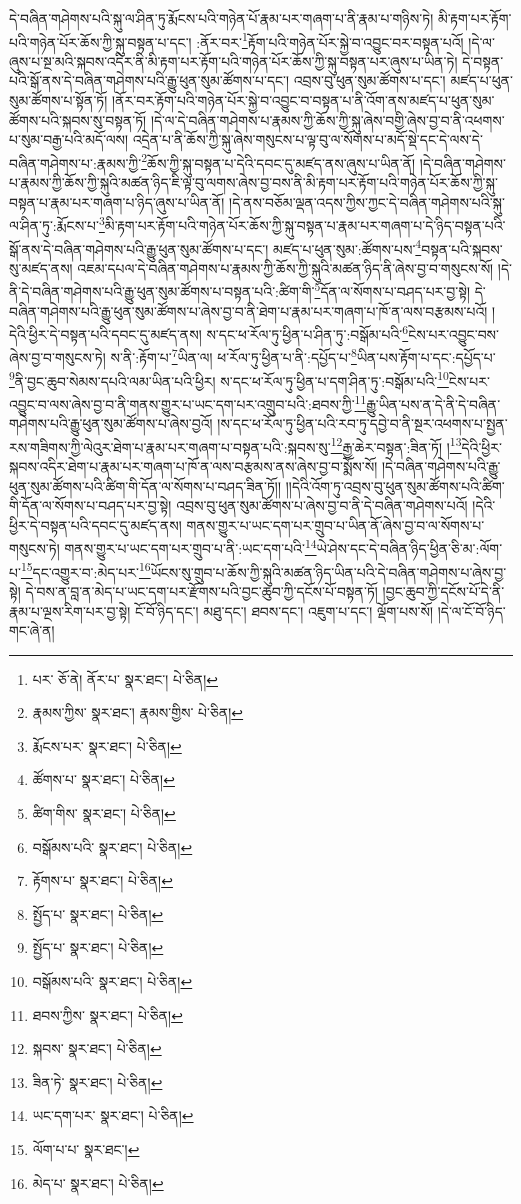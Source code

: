 དེ་བཞིན་གཤེགས་པའི་སྐུ་ལ་ཤིན་ཏུ་རྨོངས་པའི་གཉེན་པོ་རྣམ་པར་གཞག་པ་ནི་རྣམ་པ་གཉིས་ཏེ། མི་རྟག་པར་རྟོག་པའི་གཉེན་པོར་ཆོས་ཀྱི་སྐུ་བསྟན་པ་དང་། :ནོར་བར་\footnote{པར་  ཅོ་ནེ། ནོར་པ་  སྣར་ཐང་།  པེ་ཅིན། }རྟོག་པའི་གཉེན་པོར་སྐྱེ་བ་འབྱུང་བར་བསྟན་པའོ། །དེ་ལ་ཞུས་པ་སྔ་མའི་སྐབས་འདིར་ནི་མི་རྟག་པར་རྟོག་པའི་གཉེན་པོར་ཆོས་ཀྱི་སྐུ་བསྟན་པར་ཞུས་པ་ཡིན་ཏེ། དེ་བསྟན་པའི་སྒོ་ནས་དེ་བཞིན་གཤེགས་པའི་རྒྱུ་ཕུན་སུམ་ཚོགས་པ་དང་། འབྲས་བུ་ཕུན་སུམ་ཚོགས་པ་དང་། མཛད་པ་ཕུན་སུམ་ཚོགས་པ་སྟོན་ཏོ། །ནོར་བར་རྟོག་པའི་གཉེན་པོར་སྐྱེ་བ་འབྱུང་བ་བསྟན་པ་ནི་འོག་ནས་མཛད་པ་ཕུན་སུམ་ཚོགས་པའི་སྐབས་སུ་བསྟན་ཏོ། །དེ་ལ་དེ་བཞིན་གཤེགས་པ་རྣམས་ཀྱི་ཆོས་ཀྱི་སྐུ་ཞེས་བགྱི་ཞེས་བྱ་བ་ནི་འཕགས་པ་སུམ་བརྒྱ་པའི་མདོ་ལས། འདྲེན་པ་ནི་ཆོས་ཀྱི་སྐུ་ཞེས་གསུངས་པ་ལྟ་བུ་ལ་སོགས་པ་མདོ་སྡེ་དང་དེ་ལས་དེ་བཞིན་གཤེགས་པ་:རྣམས་ཀྱི་\footnote{རྣམས་ཀྱིས་  སྣར་ཐང་། རྣམས་གྱིས་  པེ་ཅིན། }ཆོས་ཀྱི་སྐུ་བསྟན་པ་དེའི་དབང་དུ་མཛད་ནས་ཞུས་པ་ཡིན་ནོ། །དེ་བཞིན་གཤེགས་པ་རྣམས་ཀྱི་ཆོས་ཀྱི་སྐུའི་མཚན་ཉིད་ཇི་ལྟ་བུ་ལགས་ཞེས་བྱ་བས་ནི་མི་རྟག་པར་རྟོག་པའི་གཉེན་པོར་ཆོས་ཀྱི་སྐུ་བསྟན་པ་རྣམ་པར་གཞག་པ་ཉིད་ཞུས་པ་ཡིན་ནོ། །དེ་ནས་བཅོམ་ལྡན་འདས་ཀྱིས་ཀྱང་དེ་བཞིན་གཤེགས་པའི་སྐུ་ལ་ཤིན་ཏུ་:རྨོངས་པ་\footnote{རྨོངས་པར་  སྣར་ཐང་།  པེ་ཅིན། }མི་རྟག་པར་རྟོག་པའི་གཉེན་པོར་ཆོས་ཀྱི་སྐུ་བསྟན་པ་རྣམ་པར་གཞག་པ་དེ་ཉིད་བསྟན་པའི་སྒོ་ནས་དེ་བཞིན་གཤེགས་པའི་རྒྱུ་ཕུན་སུམ་ཚོགས་པ་དང་། མཛད་པ་ཕུན་སུམ་:ཚོགས་པས་\footnote{ཚོགས་པ་  སྣར་ཐང་།  པེ་ཅིན། }བསྟན་པའི་སྐབས་སུ་མཛད་ནས། འཇམ་དཔལ་དེ་བཞིན་གཤེགས་པ་རྣམས་ཀྱི་ཆོས་ཀྱི་སྐུའི་མཚན་ཉིད་ནི་ཞེས་བྱ་བ་གསུངས་སོ། །དེ་ནི་དེ་བཞིན་གཤེགས་པའི་རྒྱུ་ཕུན་སུམ་ཚོགས་པ་བསྟན་པའི་:ཚིག་གི་\footnote{ཚིག་གིས་  སྣར་ཐང་།  པེ་ཅིན། }དོན་ལ་སོགས་པ་བཤད་པར་བྱ་སྟེ། དེ་བཞིན་གཤེགས་པའི་རྒྱུ་ཕུན་སུམ་ཚོགས་པ་ཞེས་བྱ་བ་ནི་ཐེག་པ་རྣམ་པར་གཞག་པ་ཁོ་ན་ལས་བརྩམས་པའོ། །དེའི་ཕྱིར་དེ་བསྟན་པའི་དབང་དུ་མཛད་ནས། ས་དང་ཕ་རོལ་ཏུ་ཕྱིན་པ་ཤིན་ཏུ་:བསྒོམ་པའི་\footnote{བསྒོམས་པའི་  སྣར་ཐང་།  པེ་ཅིན། }ངེས་པར་འབྱུང་བས་ཞེས་བྱ་བ་གསུངས་ཏེ། ས་ནི་:རྟོག་པ་\footnote{རྟོགས་པ་  སྣར་ཐང་།  པེ་ཅིན། }ཡིན་ལ། ཕ་རོལ་ཏུ་ཕྱིན་པ་ནི་:དཔྱོད་པ་\footnote{སྤྱོད་པ་  སྣར་ཐང་།  པེ་ཅིན། }ཡིན་པས་རྟོག་པ་དང་:དཔྱོད་པ་\footnote{སྤྱོད་པ་  སྣར་ཐང་།  པེ་ཅིན། }ནི་བྱང་ཆུབ་སེམས་དཔའི་ལམ་ཡིན་པའི་ཕྱིར། ས་དང་ཕ་རོལ་ཏུ་ཕྱིན་པ་དག་ཤིན་ཏུ་:བསྒོམ་པའི་\footnote{བསྒོམས་པའི་  སྣར་ཐང་།  པེ་ཅིན། }ངེས་པར་འབྱུང་བ་ལས་ཞེས་བྱ་བ་ནི་གནས་གྱུར་པ་ཡང་དག་པར་འགྲུབ་པའི་:ཐབས་ཀྱི་\footnote{ཐབས་ཀྱིས་  སྣར་ཐང་།  པེ་ཅིན། }རྒྱུ་ཡིན་པས་ན་དེ་ནི་དེ་བཞིན་གཤེགས་པའི་རྒྱུ་ཕུན་སུམ་ཚོགས་པ་ཞེས་བྱའོ། །ས་དང་ཕ་རོལ་ཏུ་ཕྱིན་པའི་རབ་ཏུ་དབྱེ་བ་ནི་སྔར་འཕགས་པ་སྤྱན་རས་གཟིགས་ཀྱི་ལེའུར་ཐེག་པ་རྣམ་པར་གཞག་པ་བསྟན་པའི་:སྐབས་སུ་\footnote{སྐབས་  སྣར་ཐང་།  པེ་ཅིན། }རྒྱ་ཆེར་བསྟན་:ཟིན་ཏོ། །\footnote{ཟིན་ཏེ་  སྣར་ཐང་།  པེ་ཅིན། }དེའི་ཕྱིར་སྐབས་འདིར་ཐེག་པ་རྣམ་པར་གཞག་པ་ཁོ་ན་ལས་བརྩམས་ནས་ཞེས་བྱ་བ་སྨོས་སོ། །དེ་བཞིན་གཤེགས་པའི་རྒྱུ་ཕུན་སུམ་ཚོགས་པའི་ཚིག་གི་དོན་ལ་སོགས་པ་བཤད་ཟིན་ཏོ།། །།དེའི་འོག་ཏུ་འབྲས་བུ་ཕུན་སུམ་ཚོགས་པའི་ཚིག་གི་དོན་ལ་སོགས་པ་བཤད་པར་བྱ་སྟེ། འབྲས་བུ་ཕུན་སུམ་ཚོགས་པ་ཞེས་བྱ་བ་ནི་དེ་བཞིན་གཤེགས་པའོ། །དེའི་ཕྱིར་དེ་བསྟན་པའི་དབང་དུ་མཛད་ནས། གནས་གྱུར་པ་ཡང་དག་པར་གྲུབ་པ་ཡིན་ནོ་ཞེས་བྱ་བ་ལ་སོགས་པ་གསུངས་ཏེ། གནས་གྱུར་པ་ཡང་དག་པར་གྲུབ་པ་ནི་:ཡང་དག་པའི་\footnote{ཡང་དག་པར་  སྣར་ཐང་།  པེ་ཅིན། }ཡེ་ཤེས་དང་དེ་བཞིན་ཉིད་ཕྱིན་ཅི་མ་:ལོག་པ་\footnote{ལོག་པ་པ་  སྣར་ཐང་། }དང་འགྱུར་བ་:མེད་པར་\footnote{མེད་པ་  སྣར་ཐང་།  པེ་ཅིན། }ཡོངས་སུ་གྲུབ་པ་ཆོས་ཀྱི་སྐུའི་མཚན་ཉིད་ཡིན་པའི་དེ་བཞིན་གཤེགས་པ་ཞེས་བྱ་སྟེ། དེ་བས་ན་བླ་ན་མེད་པ་ཡང་དག་པར་རྫོགས་པའི་བྱང་ཆུབ་ཀྱི་དངོས་པོ་བསྟན་ཏོ། །བྱང་ཆུབ་ཀྱི་དངོས་པོ་དེ་ནི་རྣམ་པ་ལྔས་རིག་པར་བྱ་སྟེ། ངོ་བོ་ཉིད་དང་། མཐུ་དང་། ཐབས་དང་། འཇུག་པ་དང་། ལྡོག་པས་སོ། །དེ་ལ་ངོ་བོ་ཉིད་གང་ཞེ་ན། 